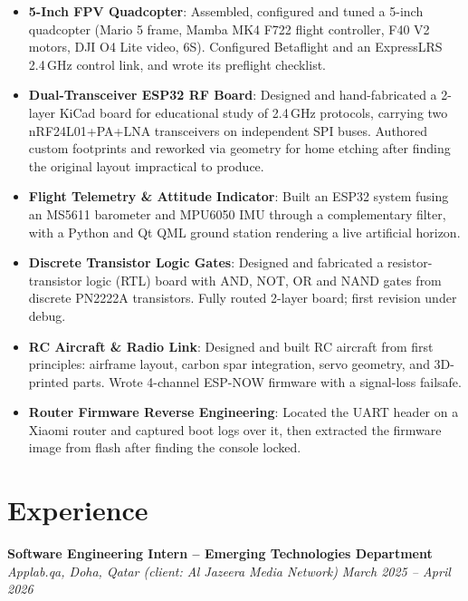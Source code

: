 \documentclass[10pt,a4paper]{article}
\begin{document}
\begin{itemize}
    \item \textbf{5-Inch FPV Quadcopter}: Assembled, configured and tuned a
    5-inch quadcopter (Mario 5 frame, Mamba MK4 F722 flight controller, F40 V2
    motors, DJI O4 Lite video, 6S). Configured Betaflight and an ExpressLRS
    2.4\,GHz control link, and wrote its preflight checklist.

    \item \textbf{Dual-Transceiver ESP32 RF Board}: Designed and hand-fabricated
    a 2-layer KiCad board for educational study of 2.4\,GHz protocols, carrying
    two nRF24L01+PA+LNA transceivers on independent SPI buses. Authored custom
    footprints and reworked via geometry for home etching after finding the
    original layout impractical to produce.

    \item \textbf{Flight Telemetry \& Attitude Indicator}: Built an ESP32 system
    fusing an MS5611 barometer and MPU6050 IMU through a complementary filter,
    with a Python and Qt QML ground station rendering a live artificial horizon.

    \item \textbf{Discrete Transistor Logic Gates}: Designed and fabricated a
    resistor-transistor logic (RTL) board with AND, NOT, OR and NAND gates from
    discrete PN2222A transistors. Fully routed 2-layer board; first revision
    under debug.

    \item \textbf{RC Aircraft \& Radio Link}: Designed and built RC aircraft from
    first principles: airframe layout, carbon spar integration, servo geometry,
    and 3D-printed parts. Wrote 4-channel ESP-NOW firmware with a signal-loss
    failsafe.

    \item \textbf{Router Firmware Reverse Engineering}: Located the UART header
    on a Xiaomi router and captured boot logs over it, then extracted the
    firmware image from flash after finding the console locked.
\end{itemize}

\section*{Experience}
\textbf{Software Engineering Intern -- Emerging Technologies Department}\\
\textit{Applab.qa, Doha, Qatar (client: Al Jazeera Media Network)} \hfill \textit{March 2025 -- April 2026}
\end{document}
